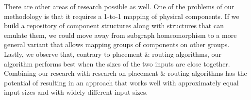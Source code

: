 There are other areas of research possible as well. One of the problems of our methodology is that it requires a 1-to-1 mapping of physical components. If we build a repository of component structures along with structures that can emulate them, we could move away from subgraph homeomorphism to a more general variant that allows mapping groups of components on other groups. Lastly, we observe that, contrary to placement \& routing algorithms, our algorithm performs best when the sizes of the two inputs are close together. Combining our research with research on placement \& routing algorithms has the potential of resulting in an approach that works well with approximately equal input sizes and with widely different input sizes.

